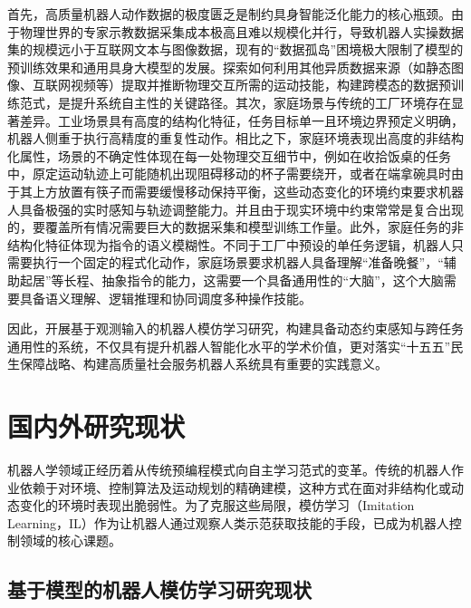 首先，高质量机器人动作数据的极度匮乏是制约具身智能泛化能力的核心瓶颈。由于物理世界的专家示教数据采集成本极高且难以规模化并行，导致机器人实操数据集的规模远小于互联网文本与图像数据，现有的“数据孤岛”困境极大限制了模型的预训练效果和通用具身大模型的发展。探索如何利用其他异质数据来源（如静态图像、互联网视频等）提取并推断物理交互所需的运动技能，构建跨模态的数据预训练范式，是提升系统自主性的关键路径。其次，家庭场景与传统的工厂环境存在显著差异。工业场景具有高度的结构化特征，任务目标单一且环境边界预定义明确，机器人侧重于执行高精度的重复性动作。相比之下，家庭环境表现出高度的非结构化属性，场景的不确定性体现在每一处物理交互细节中，例如在收拾饭桌的任务中，原定运动轨迹上可能随机出现阻碍移动的杯子需要绕开，或者在端拿碗具时由于其上方放置有筷子而需要缓慢移动保持平衡，这些动态变化的环境约束要求机器人具备极强的实时感知与轨迹调整能力。并且由于现实环境中约束常常是复合出现的，要覆盖所有情况需要巨大的数据采集和模型训练工作量。此外，家庭任务的非结构化特征体现为指令的语义模糊性。不同于工厂中预设的单任务逻辑，机器人只需要执行一个固定的程式化动作，家庭场景要求机器人具备理解“准备晚餐”，“辅助起居”等长程、抽象指令的能力，这需要一个具备通用性的“大脑”，这个大脑需要具备语义理解、逻辑推理和协同调度多种操作技能。

因此，开展基于观测输入的机器人模仿学习研究，构建具备动态约束感知与跨任务通用性的系统，不仅具有提升机器人智能化水平的学术价值，更对落实“十五五”民生保障战略、构建高质量社会服务机器人系统具有重要的实践意义。



\section{国内外研究现状}
机器人学领域正经历着从传统预编程模式向自主学习范式的变革。传统的机器人作业依赖于对环境、控制算法及运动规划的精确建模，这种方式在面对非结构化或动态变化的环境时表现出脆弱性。为了克服这些局限，模仿学习（Imitation Learning，IL）作为让机器人通过观察人类示范获取技能的手段，已成为机器人控制领域的核心课题。

\subsection{基于模型的机器人模仿学习研究现状}

